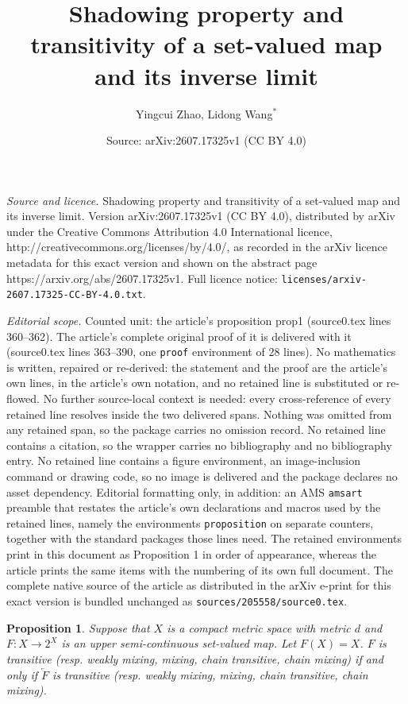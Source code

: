 \documentclass[10pt,a4paper]{amsart}
\title{Shadowing property and transitivity of a set-valued map and its inverse limit}
\author{Yingcui Zhao, Lidong Wang$^\ast$}
\date{Source: arXiv:2607.17325v1 (CC BY 4.0)}
\newtheorem{proposition}{Proposition}
\begin{document}
\maketitle

\noindent\emph{Source and licence.} Shadowing property and transitivity of a set-valued map and its inverse limit. Version arXiv:2607.17325v1 (CC BY 4.0), distributed by arXiv under the Creative Commons Attribution 4.0 International licence, http://creativecommons.org/licenses/by/4.0/, as recorded in the arXiv licence metadata for this exact version and shown on the abstract page https://arxiv.org/abs/2607.17325v1. Full licence notice: \texttt{licenses/arxiv-2607.17325-CC-BY-4.0.txt}.\par\smallskip

\noindent\textit{Editorial scope.} Counted unit: the article's proposition prop1 (source0.tex lines 360--362). The article's complete original proof of it is delivered with it (source0.tex lines 363--390, one \texttt{proof} environment of 28 lines). No mathematics is written, repaired or re-derived: the statement and the proof are the article's own lines, in the article's own notation, and no retained line is substituted or re-flowed.  No further source-local context is needed: every cross-reference of every retained line resolves inside the two delivered spans.  Nothing was omitted from any retained span, so the package carries no omission record.  No retained line contains a citation, so the wrapper carries no bibliography and no bibliography entry.  No retained line contains a figure environment, an image-inclusion command or drawing code, so no image is delivered and the package declares no asset dependency.  Editorial formatting only, in addition: an AMS \texttt{amsart} preamble that restates the article's own declarations and macros used by the retained lines, namely the environments \texttt{proposition} on separate counters, together with the standard packages those lines need.  The retained environments print in this document as Proposition 1 in order of appearance, whereas the article prints the same items with the numbering of its own full document.  The complete native source of the article as distributed in the arXiv e-print for this exact version is bundled unchanged as \texttt{sources/205558/source0.tex}.
\begin{proposition}\label{prop1}
	Suppose that $X$ is a compact metric space with metric $d$ and $F:X\rightarrow 2^X$ is an upper semi-continuous set-valued map. Let $F(X)=X$. $F$ is transitive (resp. {weakly mixing, mixing, chain transitive, chain mixing}) if and only if $\underleftarrow{F}$ is transitive (resp. {weakly mixing, mixing, chain transitive, chain mixing}).
\end{proposition}
\end{document}
